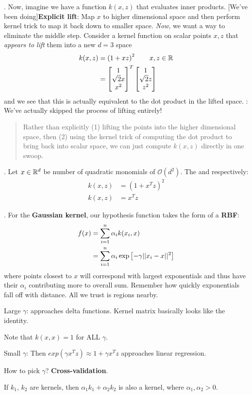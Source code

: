 \documentclass[12pt]{article}
\newcommand{\myspace}{\vspace{2\bigskipamount}}
\newcommand\p{\Needspace{10\baselineskip} \noindent}
\begin{document}
\myspace
\p {}. Now, imagine we have a function $k(x, z)$ that evaluates inner products. [We've been doing]\textbf{Explicit lift}: Map $x$ to higher dimensional space and then perform kernel trick to map it back down to smaller space. \textit{Now}, we want a way to eliminate the middle step. Consider a kernel function on scalar points $x, z$ that \textit{appears to lift} them into a new $d = 3$ space
\begin{align}
k(x, z) &= \left(1 + xz\right)^2 \qquad x,z \in \mathbb{R} \\
&= \begin{bmatrix}
1 \\ \sqrt{2} x \\ x^2 
\end{bmatrix}^T
\begin{bmatrix}
1 \\ \sqrt{2} z \\ z^2 
\end{bmatrix}
\end{align}
and we see that this is actually equivalent to the dot product in the lifted space. : We've actually skipped the process of lifting entirely! 
\begin{quote}
	Rather than explicitly (1) lifting the points into the higher dimensional space, then (2) using the kernel trick of computing the dot product to bring back into scalar space, we can just compute $k(x, z)$ directly in one swoop. 
\end{quote}
. Let $x \in \mathbb{R}^d$ be number of quadratic monomials of $\mathcal{O}(d^2)$. The  and  respectively:
\begin{align}
k(x, z) &= \left(1 + x^Tz\right)^2  \\
k(x, z) &= x^T z
\end{align}


\myspace
\p {}. For the \textbf{Gaussian kernel}, our hypothesis function takes the form of a \textbf{RBF}:
\begin{align}
	f(x) &= \sum_{i=1}^{n} \alpha_i k(x_i, x) \\
	&= \sum_{i=1}^{n} \alpha_i \exp\left[-\gamma||x_i - x||^2 \right]
\end{align}
where points closest to $x$ will correspond with largest exponentials and thus have their $\alpha_i$ contributing more to overall sum.  Remember how quickly exponentials fall off with distance. All we trust is regions nearby.
\begin{compactitem}
	\item Large $\gamma$: approaches delta functions. Kernel matrix basically looks like the identity. 
	\item Note that $k(x, x) = 1$ for ALL $\gamma$. 
	\item Small $\gamma$: Then $exp(\gamma x^T z) \approx 1 + \gamma x^T z$ approaches linear regression. 
	\item How to pick $\gamma$? \textbf{Cross-validation}. 
	\item If $k_1$, $k_2$ are kernels, then $\alpha_1 k_1 + \alpha_2 k_2$ is also a kernel, where $\alpha_1, \alpha_2 > 0$. 
\end{compactitem}
\end{document}
